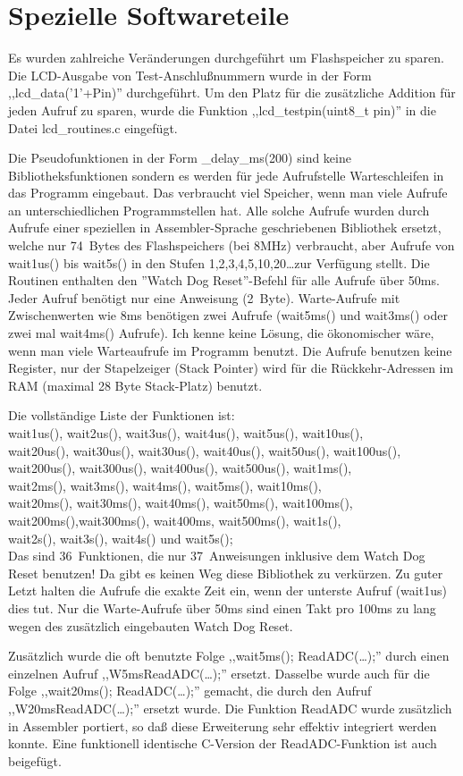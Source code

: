 
\chapter{Spezielle Softwareteile}

Es wurden zahlreiche Veränderungen durchgeführt um Flashspeicher zu sparen.
Die LCD-Ausgabe von Test-Anschlußnummern wurde in der Form ,,lcd\_data('1'+Pin)'' durchgeführt.
Um den Platz für die zusätzliche Addition für jeden Aufruf zu sparen, wurde die
Funktion ,,lcd\_testpin(uint8\_t pin)'' in die Datei lcd\_routines.c eingefügt.


Die Pseudofunktionen in der Form \_delay\_ms(200) sind keine Bibliotheksfunktionen
sondern es werden für jede Aufrufstelle Warteschleifen in das Programm eingebaut.
Das verbraucht viel Speicher, wenn man viele Aufrufe an unterschiedlichen Programmstellen hat.
Alle solche Aufrufe wurden durch Aufrufe einer speziellen in Assembler-Sprache geschriebenen
Bibliothek ersetzt, welche nur 74~Bytes des Flashspeichers (bei 8MHz) verbraucht, aber
Aufrufe von wait1us() bis wait5s() in den Stufen 1,2,3,4,5,10,20\dots zur Verfügung stellt.
Die Routinen enthalten den ''Watch Dog Reset''-Befehl für alle Aufrufe über 50ms.
Jeder Aufruf benötigt nur eine Anweisung (2~Byte). Warte-Aufrufe mit Zwischenwerten
wie 8ms benötigen zwei Aufrufe (wait5ms() und wait3ms() oder zwei mal wait4ms() Aufrufe).
Ich kenne keine Lösung, die ökonomischer wäre, wenn man viele Warteaufrufe im Programm benutzt.
Die Aufrufe benutzen keine Register, nur der Stapelzeiger (Stack Pointer) wird für die Rückkehr-Adressen
im RAM (maximal 28 Byte Stack-Platz) benutzt.

Die vollständige Liste der Funktionen ist:\\
wait1us(), wait2us(), wait3us(), wait4us(), wait5us(), wait10us(), \\
wait20us(), wait30us(), wait30us(), wait40us(), wait50us(), wait100us(), \\
wait200us(), wait300us(), wait400us(), wait500us(), wait1ms(),\\
wait2ms(), wait3ms(), wait4ms(), wait5ms(), wait10ms(),\\
wait20ms(), wait30ms(), wait40ms(), wait50ms(), wait100ms(),\\
wait200ms(),wait300ms(), wait400ms, wait500ms(), wait1s(),\\
wait2s(), wait3s(), wait4s() und wait5s();\\
Das sind 36~Funktionen, die nur 37~Anweisungen inklusive dem Watch Dog Reset benutzen!
Da gibt es keinen Weg diese Bibliothek zu verkürzen.
Zu guter Letzt halten die Aufrufe die exakte Zeit ein, wenn der unterste Aufruf (wait1us) dies tut.
Nur die Warte-Aufrufe über 50ms sind einen Takt pro 100ms zu lang wegen des zusätzlich eingebauten
Watch Dog Reset.


Zusätzlich wurde die oft benutzte Folge ,,wait5ms(); ReadADC(\dots);'' durch einen einzelnen Aufruf
,,W5msReadADC(\dots);'' ersetzt.
Dasselbe wurde auch für die Folge ,,wait20ms(); ReadADC(\dots);'' gemacht, die durch den Aufruf
,,W20msReadADC(\dots);'' ersetzt wurde.
Die Funktion ReadADC wurde zusätzlich in Assembler portiert, so daß diese Erweiterung
sehr effektiv integriert werden konnte.
Eine funktionell identische C-Version der ReadADC-Funktion ist auch beigefügt.
